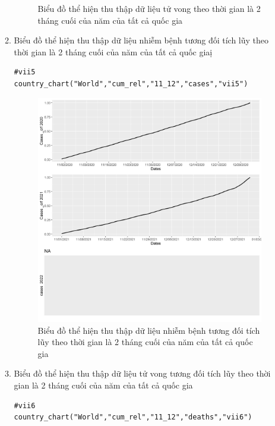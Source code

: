 \documentclass[a4paper]{article}
\theoremstyle{definition}
\begin{document}
\begin{enumerate}[i)]
\begin{enumerate}[1)]
\begin{figure}[htp]
		    \caption{Biểu đồ thể hiện thu thập dữ liệu tử vong theo thời gian là 2 tháng cuối của năm của tất cả quốc gia}
		    \label{fig:my_label}
		\end{figure}
		\newpage
    \item Biểu đồ thể hiện thu thập dữ liệu nhiễm bệnh tương đối tích lũy theo thời gian là 2 tháng cuối của năm của tất cả quốc giaị
    \begin{lstlisting}[frame=single]  
#vii5
country_chart("World","cum_rel","11_12","cases","vii5")
		\end{lstlisting}
		\begin{figure}[htp]
		    \centering
		    \includegraphics[scale = 0.7]{Images/VII/vii5 World .jpeg}
		    \caption{Biểu đồ thể hiện thu thập dữ liệu nhiễm bệnh tương đối tích lũy theo thời gian là 2 tháng cuối của năm của tất cả quốc gia}
		    \label{fig:my_label}
		\end{figure}
		\newpage
    \item Biểu đồ thể hiện thu thập dữ liệu tử vong tương đối tích lũy theo thời gian là 2 tháng cuối của năm của tất cả quốc gia
    \begin{lstlisting}[frame=single]  
#vii6
country_chart("World","cum_rel","11_12","deaths","vii6")
		\end{lstlisting}
		\begin{figure}[htp]

\end{figure}
\end{enumerate}
\end{enumerate}
\end{document}
